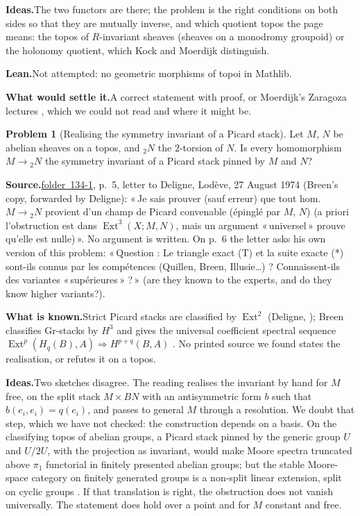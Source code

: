 \documentclass[11pt]{article}
\newcommand{\q}[1]{«\,#1\,»}
\newcommand{\fac}[1]{\href{https://grothendieck.umontpellier.fr/#1.pdf}{folder~#1}}
\newcommand{\Ext}{\operatorname{Ext}}
\theoremstyle{definition}
\newtheorem{problem}{Problem}
\theoremstyle{plain}\newtheorem*{proposition}{Proposition}\theoremstyle{definition}
\newcommand{\entry}[1]{\par\medskip\noindent\textbf{#1}\enspace}
\newcommand{\src}[1]{\entry{Source.}#1}
\newcommand{\known}{\entry{What is known.}}
\newcommand{\ideas}{\entry{Ideas.}}
\newcommand{\leanst}{\entry{Lean.}}
\newcommand{\settle}{\entry{What would settle it.}}
\begin{document}
\ideas The two functors are there; the problem is the right conditions on both sides so that they are mutually inverse, and which quotient topos the page means: the topos of $R$-invariant sheaves (sheaves on a monodromy groupoid) or the holonomy quotient, which Kock and Moerdijk distinguish.

\leanst Not attempted: no geometric morphisms of topoi in Mathlib.

\settle A correct statement with proof, or Moerdijk's Zaragoza lectures \cite{moerdijk1993}, which we could not read and where it might be.

\begin{problem}[Realising the symmetry invariant of a Picard stack]\label{p:pic}
Let $M$, $N$ be abelian sheaves on a topos, and ${}_2N$ the $2$-torsion of $N$. Is every homomorphism $M \to {}_2N$ the symmetry invariant of a Picard stack pinned by $M$ and $N$?
\end{problem}

\src{\fac{134-1}, p.~5, letter to Deligne, Lodève, 27 August 1974 (Breen's copy, forwarded by Deligne): \q{Je sais prouver (sauf erreur) que tout hom.\ $M \to {}_2N$ provient d'un champ de Picard convenable (épinglé par $M$, $N$) (a priori l'obstruction est dans $\Ext^3(X; M, N)$, mais un argument \q{universel} prouve qu'elle est nulle)}. No argument is written. On p.~6 the letter asks his own version of this problem: \q{Question : Le triangle exact (T) et la suite exacte (*) sont-ils connus par les compétences (Quillen, Breen, Illusie\dots) ? Connaissent-ils des variantes \q{supérieures} ?} (are they known to the experts, and do they know higher variants?).}

\known Strict Picard stacks are classified by $\Ext^2$ (Deligne, \cite[XVIII, 1.4]{sga4}); Breen classifies Gr-stacks by $H^3$ and gives the universal coefficient spectral sequence $\Ext^p(H_q(B), A) \Rightarrow H^{p+q}(B, A)$ \cite[\S6]{breen1999}. No printed source we found states the realisation, or refutes it on a topos.

\ideas Two sketches disagree. The reading realises the invariant by hand for $M$ free, on the split stack $M \times BN$ with an antisymmetric form $b$ such that $b(e_i, e_i) = q(e_i)$, and passes to general $M$ through a resolution. We doubt that step, which we have not checked: the construction depends on a basis. On the classifying topos of abelian groups, a Picard stack pinned by the generic group $U$ and $U/2U$, with the projection as invariant, would make Moore spectra truncated above $\pi_1$ functorial in finitely presented abelian groups; but the stable Moore-space category on finitely generated groups is a non-split linear extension, split on cyclic groups \cite[Rem.~1.5.5]{baues}. If that translation is right, the obstruction does not vanish universally. The statement does hold over a point and for $M$ constant and free.
\end{document}
